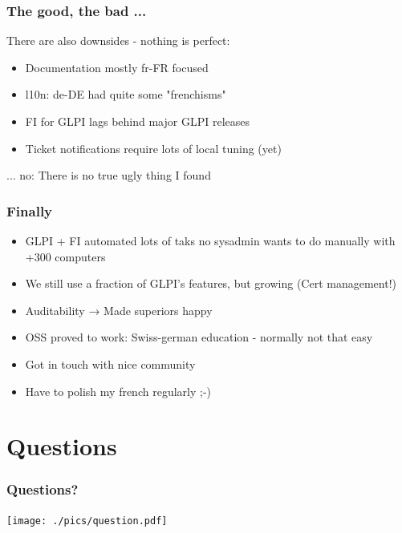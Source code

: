 \documentclass{beamer}
\begin{document}
\begin{frame}
    \frametitle{The good, the bad ...}
    There are also downsides - nothing is perfect:
    \begin{itemize}
	\item Documentation mostly fr-FR focused
	\item l10n: de-DE had quite some "frenchisms"
	\item FI for GLPI lags behind major GLPI releases
	\item Ticket notifications require lots of local tuning (yet)
    \end{itemize}
    ... no: There is no true ugly thing I found
\end{frame}

\begin{frame}
    \frametitle{Finally}
    \begin{itemize}
	\item GLPI + FI automated lots of taks no sysadmin wants to do manually with +300 computers
	\item We still use a fraction of GLPI's features, but growing (Cert management!)
	\item Auditability →  Made superiors happy
	\item OSS proved to work: Swiss-german education - normally not that easy
	\item Got in touch with nice community
	\item Have to polish my french regularly ;-)
    \end{itemize}
\end{frame}

\section{Questions}

\begin{frame}
    \frametitle{Questions?}

    \begin{center}

    \texttt{[image: ./pics/question.pdf]}

    \end{center}

\end{frame}
\end{document}

